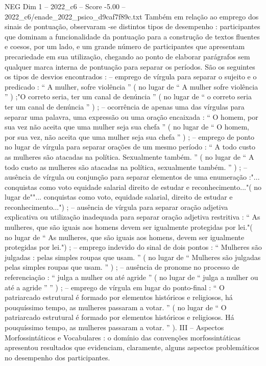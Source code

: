 \begin{textsample}{NEG Dim 1 – 2022\_c6 – Score -5.00 – 2022\_c6/enade\_2022\_psico\_d9caf7f89c.txt}
Também em relação ao emprego dos sinais de pontuação, observaram -se distintos tipos de desempenho : participantes que dominam a funcionalidade da pontuação para a construção de textos fluentes e coesos, por um lado, e um grande número de participantes que apresentam precariedade em sua utilização, chegando ao ponto de elaborar parágrafos sem qualquer marca interna de pontuação para separar os períodos.
São os seguintes os tipos de desvios encontrados : – emprego de vírgula para separar o sujeito e o predicado : “ A mulher, sofre violência ” ( no lugar de “ A mulher sofre violência ” ) ;"O correto seria, ter um canal de denúncia ” ( no lugar de “ o correto seria ter um canal de denúncia ” ) ; – ocorrência de apenas uma das vírgulas para separar uma palavra, uma expressão ou uma oração encaixada : “ O homem, por sua vez não aceita que uma mulher seja sua chefa ” ( no lugar de “ O homem, por sua vez, não aceita que uma mulher seja sua chefa ” ) ; – emprego de ponto no lugar de vírgula para separar orações de um mesmo período : “ A todo custo as mulheres são atacadas na política.
Sexualmente também. ” ( no lugar de “ A todo custo as mulheres são atacadas na política, sexualmente também. ” ) ; – ausência de vírgula ou conjunção para separar elementos de uma enumeração :"... conquistas como voto equidade salarial direito de estudar e reconhecimento..."( no lugar de""... conquistas como voto, equidade salarial, direito de estudar e reconhecimento...") ; – ausência de vírgula para separar oração adjetiva explicativa ou utilização inadequada para separar oração adjetiva restritiva : “ As mulheres, que são iguais aos homens devem ser igualmente protegidas por lei."( no lugar de “ As mulheres, que são iguais aos homens, devem ser igualmente protegidas por lei.") ; – emprego indevido do sinal de dois pontos : “ Mulheres são julgadas : pelas simples roupas que usam. ” ( no lugar de “ Mulheres são julgadas pelas simples roupas que usam. ” ) ; – ausência de pronome no processo de referenciação : “ julga a mulher ou até agride ” ( no lugar de “ julga a mulher ou até a agride ” ” ) ; – emprego de vírgula em lugar do ponto-final : “ O patriarcado estrutural é formado por elementos históricos e religiosos, há pouquíssimo tempo, as mulheres passaram a votar. ” ( no lugar de “ O patriarcado estrutural é formado por elementos históricos e religiosos.
Há pouquíssimo tempo, as mulheres passaram a votar. ” ).
III – Aspectos Morfossintáticos e Vocabulares : o domínio das convenções morfossintáticas apresentou resultados que evidenciam, claramente, alguns aspectos problemáticos no desempenho dos participantes.

\end{textsample}
